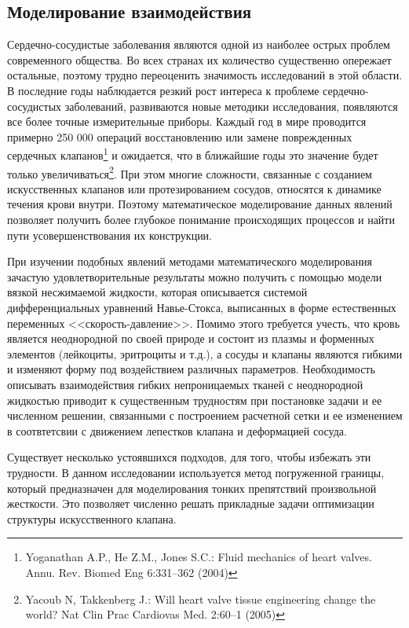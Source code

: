 \subsection*{Моделирование взаимодействия}

Сердечно-сосудистые заболевания являются одной из наиболее острых проблем современного общества. Во всех странах их количество существенно опережает остальные, поэтому трудно переоценить значимость исследований в этой области. В последние годы наблюдается резкий рост интереса к проблеме сердечно-сосудистых заболеваний, развиваются новые методики исследования, появляются все более точные измерительные приборы. Каждый год в мире проводится примерно 250 000 операций восстановлению или замене поврежденных сердечных клапанов\footnote{
    Yoganathan A.P., He Z.M., Jones S.C.: Fluid mechanics of heart valves. Annu. Rev. Biomed Eng 6:331--362 (2004)
} %
и ожидается, что в ближайшие годы это значение будет только увеличиваться\footnote{
    Yacoub N, Takkenberg J.: Will heart valve tissue engineering change the world? Nat Clin Prac Cardiovas Med. 2:60--1 (2005)
}. При этом многие сложности, связанные с созданием искусственных клапанов или протезированием сосудов, относятся к динамике течения крови внутри. Поэтому математическое моделирование данных явлений позволяет получить более глубокое понимание происходящих процессов и найти пути усовершенствования их конструкции. 

При изучении подобных явлений методами математического моделирования зачастую удовлетворительные результаты можно получить с помощью модели вязкой несжимаемой жидкости, которая описывается системой дифференциальных уравнений Навье-Стокса, выписанных в форме естественных переменных <<скорость-давление>>. Помимо этого требуется учесть, что кровь является неоднородной по своей природе и состоит из плазмы и форменных элементов (лейкоциты, эритроциты и т.д.), а сосуды и клапаны являются гибкими и изменяют форму под воздействием различных параметров. Необходимость описывать взаимодействия гибких непроницаемых тканей с неоднородной жидкостью приводит к существенным трудностям при постановке задачи и ее численном решении, связанными с построением расчетной сетки и ее изменением в соотвтетсвии с движением лепестков клапана и деформацией сосуда. 

Существует несколько устоявшихся подходов, для того, чтобы избежать эти трудности. В данном исследовании используется метод погруженной границы, который предназначен для моделирования тонких препятствий произвольной жесткости. Это позволяет численно решать прикладные задачи оптимизации структуры искусственного клапана.


